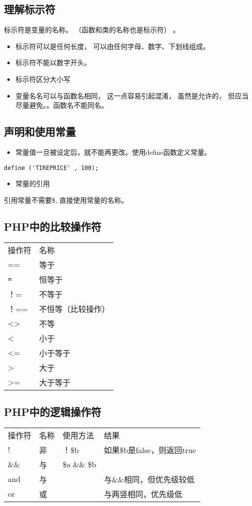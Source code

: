 \documentclass[11pt]{article}
\begin{document}
\subsection{理解标示符}
\label{sec:orgc6f4db4}
标示符是变量的名称。 （函数和类的名称也是标示符） 。
\begin{itemize}
\item 标示符可以是任何长度， 可以由任何字母、数字、下划线组成。
\item 标示符不能以数字开头。
\item 标示符区分大小写
\item 变量名名可以与函数名相同， 这一点容易引起混淆， 虽然是允许的， 但应当尽量避免。。函数名不能同名。
\end{itemize}
\subsection{声明和使用常量}
\label{sec:orgf9645f8}
\begin{itemize}
\item 常量值一旦被设定后，就不能再更改。使用define函数定义常量。
\end{itemize}
\begin{verbatim}
define ('TIREPRICE' , 100);  
\end{verbatim}


\begin{itemize}
\item 常量的引用
\end{itemize}
引用常量不需要\$, 直接使用常量的名称。
\subsection{PHP中的比较操作符}
\label{sec:orgcfc34d8}
\begin{center}
\begin{tabular}{ll}
操作符 & 名称\\
== & 等于\\
\texttt{=} & 恒等于\\
！= & 不等于\\
！== & 不恒等（比较操作）\\
<> & 不等\\
< & 小于\\
<= & 小于等于\\
> & 大于\\
>= & 大于等于\\
\end{tabular}
\end{center}
\subsection{PHP中的逻辑操作符}
\label{sec:org1856903}
\begin{center}
\begin{tabular}{llll}
操作符 & 名称 & 使用方法 & 结果\\
! & 非 & ！\$b & 如果\$b是false，则返回true\\
\&\& & 与 & \$a \&\& \$b & \\
and & 与 &  & 与\&\&相同，但优先级较低\\
or & 或 &  & 与两竖相同，优先级低\\
\end{tabular}
\end{center}
\end{document}
